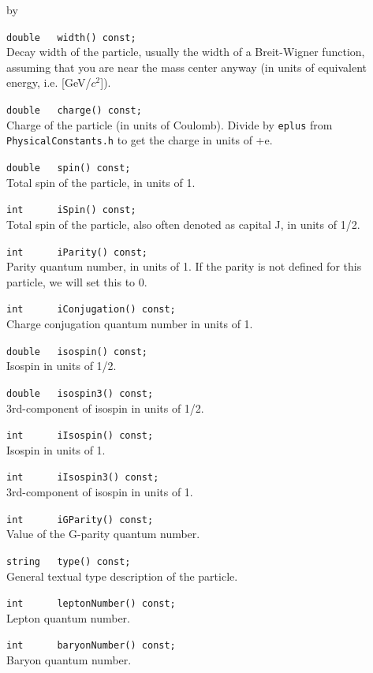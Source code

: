 \documentclass[twoside]{article}
\newcommand{\comp}[1]{\texttt{#1}}%
\newcommand{\entrylabel}[1]{\mbox{\textbf{{#1}}}\hfil}%
\newenvironment{entry}
{\begin{list}{}%
    {\renewcommand{\makelabel}{\entrylabel}%
     \setlength{\labelwidth}{90pt}%
     \setlength{\leftmargin}{\labelwidth}
     \advance\leftmargin by \labelsep%
      }%
    }%
  {\end{list}}
\newcommand{\Entrylabel}[1]%
{\raisebox{0pt}[1ex][0pt]{\makebox[\labelwidth][l]%
    {\parbox[t]{\labelwidth}{\hspace{0pt}\textbf{{#1}}}}}}
\newenvironment{Entry}%
{\renewcommand{\entrylabel}{\Entrylabel}\begin{entry}}%
  {\end{entry}}
\begin{document}
\begin{Entry}
    \verb+double   width() const;+\\
    Decay width of the particle, usually the width of a
    Breit-Wigner function, assuming that you are near the
    mass center anyway (in units of equivalent energy, i.e. [GeV/$c^2$]).
    
    \verb+double   charge() const;+\\
    Charge of the particle (in units of Coulomb). Divide by \comp{eplus}
    from \comp{PhysicalConstants.h} to get the charge in units of +e.
    
    \verb+double   spin() const;+\\
    Total spin of the particle, in units of 1.
    
    \verb+int      iSpin() const;+\\
    Total spin of the particle, also often denoted as
    capital J, in units of 1/2.
    
    \verb+int      iParity() const;+\\ 
    Parity quantum number, in units of 1.
    If the parity is not defined for this particle,
    we will set this to 0.
    
    \verb+int      iConjugation() const;+\\
    Charge conjugation quantum number in units of 1.
    
    \verb+double   isospin() const;+\\
    Isospin in units of 1/2.
    
    \verb+double   isospin3() const;+\\ 
    3rd-component of isospin in units of 1/2.
    
    \verb+int      iIsospin() const;+\\
    Isospin in units of 1.
    
    \verb+int      iIsospin3() const;+\\ 
    3rd-component of isospin in units of 1.
    
    \verb+int      iGParity() const;+\\
    Value of the G-parity quantum number.
    
    \verb+string   type() const;+\\
    General textual type description of the particle.
    
    \verb+int      leptonNumber() const;+\\
    Lepton quantum number.
    
    \verb+int      baryonNumber() const;+\\
    Baryon quantum number.
    

\end{Entry}
\end{document}
